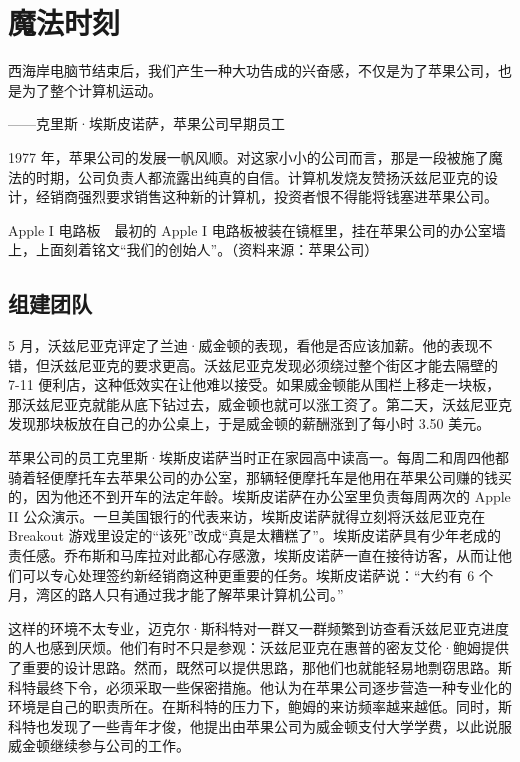 \documentclass[12pt,UTF8]{ctexbook}
\begin{document}
\section{魔法时刻}


西海岸电脑节结束后，我们产生一种大功告成的兴奋感，不仅是为了苹果公司，也是为了整个计算机运动。

——克里斯·埃斯皮诺萨，苹果公司早期员工



1977 年，苹果公司的发展一帆风顺。对这家小小的公司而言，那是一段被施了魔法的时期，公司负责人都流露出纯真的自信。计算机发烧友赞扬沃兹尼亚克的设计，经销商强烈要求销售这种新的计算机，投资者恨不得能将钱塞进苹果公司。



Apple I 电路板　最初的 Apple I 电路板被装在镜框里，挂在苹果公司的办公室墙上，上面刻着铭文“我们的创始人”。（资料来源：苹果公司）





\subsection{组建团队}


5 月，沃兹尼亚克评定了兰迪·威金顿的表现，看他是否应该加薪。他的表现不错，但沃兹尼亚克的要求更高。沃兹尼亚克发现必须绕过整个街区才能去隔壁的 7-11 便利店，这种低效实在让他难以接受。如果威金顿能从围栏上移走一块板，那沃兹尼亚克就能从底下钻过去，威金顿也就可以涨工资了。第二天，沃兹尼亚克发现那块板放在自己的办公桌上，于是威金顿的薪酬涨到了每小时 3.50 美元。

苹果公司的员工克里斯·埃斯皮诺萨当时正在家园高中读高一。每周二和周四他都骑着轻便摩托车去苹果公司的办公室，那辆轻便摩托车是他用在苹果公司赚的钱买的，因为他还不到开车的法定年龄。埃斯皮诺萨在办公室里负责每周两次的 Apple II 公众演示。一旦美国银行的代表来访，埃斯皮诺萨就得立刻将沃兹尼亚克在 Breakout 游戏里设定的“该死”改成“真是太糟糕了”。埃斯皮诺萨具有少年老成的责任感。乔布斯和马库拉对此都心存感激，埃斯皮诺萨一直在接待访客，从而让他们可以专心处理签约新经销商这种更重要的任务。埃斯皮诺萨说：“大约有 6 个月，湾区的路人只有通过我才能了解苹果计算机公司。”

这样的环境不太专业，迈克尔·斯科特对一群又一群频繁到访查看沃兹尼亚克进度的人也感到厌烦。他们有时不只是参观：沃兹尼亚克在惠普的密友艾伦·鲍姆提供了重要的设计思路。然而，既然可以提供思路，那他们也就能轻易地剽窃思路。斯科特最终下令，必须采取一些保密措施。他认为在苹果公司逐步营造一种专业化的环境是自己的职责所在。在斯科特的压力下，鲍姆的来访频率越来越低。同时，斯科特也发现了一些青年才俊，他提出由苹果公司为威金顿支付大学学费，以此说服威金顿继续参与公司的工作。
\end{document}
